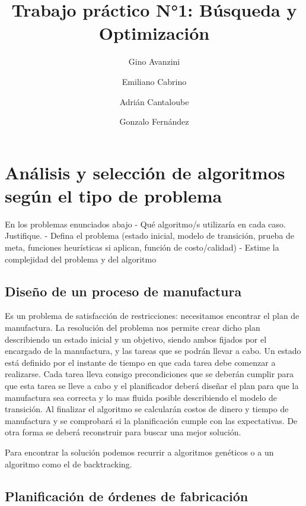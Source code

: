 \documentclass[
]{article}
\title{Trabajo práctico N°1: Búsqueda y Optimización}
\author{Gino Avanzini \and Emiliano Cabrino \and Adrián Cantaloube \and Gonzalo Fernández}
\date{}
\begin{document}
\maketitle

\hypertarget{anuxe1lisis-y-selecciuxf3n-de-algoritmos-seguxfan-el-tipo-de-problema}{%
\section{Análisis y selección de algoritmos según el tipo de
problema}\label{anuxe1lisis-y-selecciuxf3n-de-algoritmos-seguxfan-el-tipo-de-problema}}

En los problemas enunciados abajo - Qué algoritmo/s utilizaría en cada
caso. Justifique. - Defina el problema (estado inicial, modelo de
transición, prueba de meta, funciones heurísticas si aplican, función de
costo/calidad) - Estime la complejidad del problema y del algoritmo

\hypertarget{diseuxf1o-de-un-proceso-de-manufactura}{%
\subsection{Diseño de un proceso de
manufactura}\label{diseuxf1o-de-un-proceso-de-manufactura}}

Es un problema de satisfacción de restricciones: necesitamos encontrar
el plan de manufactura. La resolución del problema nos permite crear
dicho plan describiendo un estado inicial y un objetivo, siendo ambos
fijados por el encargado de la manufactura, y las tareas que se podrán
llevar a cabo. Un estado está definido por el instante de tiempo en que
cada tarea debe comenzar a realizarse. Cada tarea lleva consigo
precondiciones que se deberán cumplir para que esta tarea se lleve a
cabo y el planificador deberá diseñar el plan para que la manufactura
sea correcta y lo mas fluida posible describiendo el modelo de
transición. Al finalizar el algoritmo se calcularán costos de dinero y
tiempo de manufactura y se comprobará si la planificación cumple con las
expectativas. De otra forma se deberá reconstruir para buscar una mejor
solución.

Para encontrar la solución podemos recurrir a algoritmos genéticos o a
un algoritmo como el de backtracking.

\hypertarget{planificaciuxf3n-de-uxf3rdenes-de-fabricaciuxf3n}{%
\subsection{Planificación de órdenes de
fabricación}\label{planificaciuxf3n-de-uxf3rdenes-de-fabricaciuxf3n}}
\end{document}
